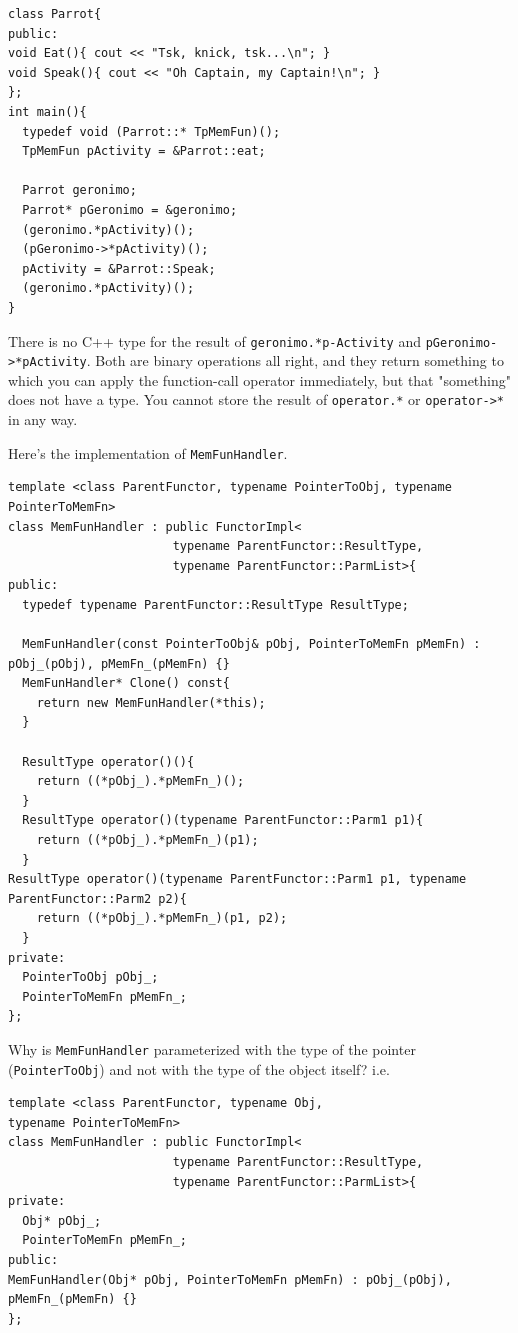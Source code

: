 \begin{verbatim}
class Parrot{
public:
void Eat(){ cout << "Tsk, knick, tsk...\n"; }
void Speak(){ cout << "Oh Captain, my Captain!\n"; }
};
int main(){
  typedef void (Parrot::* TpMemFun)();
  TpMemFun pActivity = &Parrot::eat;
  
  Parrot geronimo;
  Parrot* pGeronimo = &geronimo;
  (geronimo.*pActivity)();
  (pGeronimo->*pActivity)();
  pActivity = &Parrot::Speak;
  (geronimo.*pActivity)();
}
\end{verbatim}

There is no C++ type for the result of \texttt{geronimo.*p-Activity}
and \texttt{pGeronimo->*pActivity}. Both are binary operations all
right, and they return something to which you can apply the 
function-call operator immediately, but that "something" does not have
a type. You cannot store the result of \texttt{operator.*} or
\texttt{operator->*} in any way.

Here's the implementation of \texttt{MemFunHandler}.
\begin{verbatim}
template <class ParentFunctor, typename PointerToObj, typename PointerToMemFn>
class MemFunHandler : public FunctorImpl<
                       typename ParentFunctor::ResultType,
                       typename ParentFunctor::ParmList>{
public:
  typedef typename ParentFunctor::ResultType ResultType;

  MemFunHandler(const PointerToObj& pObj, PointerToMemFn pMemFn) : pObj_(pObj), pMemFn_(pMemFn) {}
  MemFunHandler* Clone() const{ 
    return new MemFunHandler(*this); 
  }

  ResultType operator()(){
    return ((*pObj_).*pMemFn_)();
  }
  ResultType operator()(typename ParentFunctor::Parm1 p1){
    return ((*pObj_).*pMemFn_)(p1);
  }
ResultType operator()(typename ParentFunctor::Parm1 p1, typename ParentFunctor::Parm2 p2){
    return ((*pObj_).*pMemFn_)(p1, p2);
  }
private:
  PointerToObj pObj_;
  PointerToMemFn pMemFn_;
};
\end{verbatim}

Why is \texttt{MemFunHandler} parameterized with the type of the
pointer (\texttt{PointerToObj}) and not with the  type of the object
itself? i.e.
\begin{verbatim}
template <class ParentFunctor, typename Obj,
typename PointerToMemFn>
class MemFunHandler : public FunctorImpl<
                       typename ParentFunctor::ResultType,
                       typename ParentFunctor::ParmList>{
private:
  Obj* pObj_;
  PointerToMemFn pMemFn_;
public:
MemFunHandler(Obj* pObj, PointerToMemFn pMemFn) : pObj_(pObj), pMemFn_(pMemFn) {}
};
\end{verbatim}

